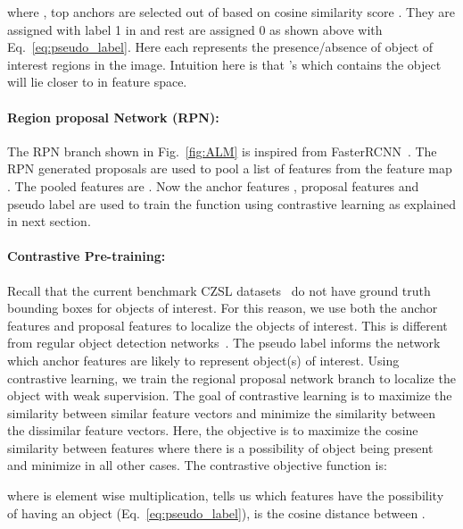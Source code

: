 \documentclass{bmvc2k}
\begin{document}
\vspace{-0.2cm}

where ,  top anchors are selected out of  based on cosine similarity score . 
They are assigned with label 1 in  and rest are assigned 0 as shown above with Eq.~\ref{eq:pseudo_label}. Here each  represents the presence/absence of object of interest regions in the image.
Intuition here is that 's which contains the object will lie closer to  in feature space.

\vspace{-0.2cm}
\paragraph{Region proposal Network (RPN):} The RPN branch shown in Fig.~\ref{fig:ALM} is inspired from FasterRCNN~\cite{ren2015faster}. 
The RPN generated proposals are used to pool a list of features from the feature map . The pooled features are  . Now the anchor features , proposal features  and pseudo label  are used to train the function  using contrastive learning as explained in next section.

\vspace{-0.2cm}
\paragraph{Contrastive Pre-training:}\label{section:contrastive pre-train}Recall that the current benchmark CZSL datasets~\cite{isola2015discovering,mancini2021learning,yu2017semantic} do not have ground truth bounding boxes for objects of interest. For this reason, we use both the anchor features and proposal features to localize the objects of interest. This is different from regular object detection networks~\cite{ren2015faster}. 
The pseudo label  informs the network which anchor features are likely to represent object(s) of interest. Using contrastive learning, we train the regional proposal network branch to localize the object with weak supervision.
The goal of contrastive learning is to maximize the similarity between similar feature vectors and minimize the similarity between the dissimilar feature vectors. 
Here, the objective is to maximize the cosine similarity between  features where there is a possibility of object being present and minimize in all other cases. The contrastive objective function is:


where  is element wise multiplication,  tells us which features have the possibility of having an object (Eq.~\ref{eq:pseudo_label}),  is the cosine distance between .
\end{document}
